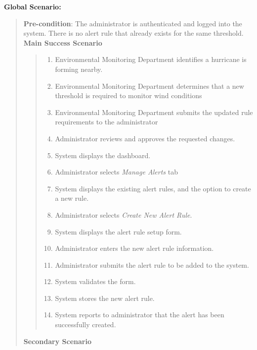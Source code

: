 \documentclass[]{article}
\begin{document}
\begin{enumerate}[{\bf BE1.}]
        {\bf Global Scenario:}
        	\begin{quote}
        	    \textbf{Pre-condition}: The administrator is authenticated and logged into the system. There is no alert rule that already exists for the same threshold. \\
                \textbf{Main Success Scenario} 
                    \begin{quote}
                    \begin{enumerate}[1.]
                        \item Environmental Monitoring Department identifies a hurricane is forming nearby.
                        \item Environmental Monitoring Department determines that a new threshold is required to monitor wind conditions 
                        \item Environmental Monitoring Department submits the updated rule requirements to the administrator
                        \item Administrator reviews and approves the requested changes.
                        \item System displays the dashboard.
                        \item Administrator selects \textit{Manage Alerts} tab
                        \item System displays the existing alert rules, and the option to create a new rule.
                        \item Administrator selects \textit{Create New Alert Rule}.
                        \item System displays the alert rule setup form.
                        \item Administrator enters the new alert rule information.
                        \item Administrator submits the alert rule to be added to the system.
                        \item System validates the form.
                        \item System stores the new alert rule.
                        \item System reports to administrator that the alert has been successfully created.
                    \end{enumerate}
                    \end{quote}
                \textbf{Secondary Scenario} 
                \begin{quote}

\end{quote}
\end{quote}
\end{enumerate}
\end{document}
